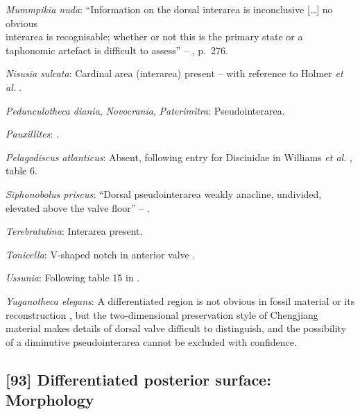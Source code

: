 \documentclass[openany]{book}
\begin{document}
\hypertarget{Mummpikia_nuda-coding-92}{}
\emph{Mummpikia nuda}: ``Information on the dorsal interarea is
inconclusive {[}\ldots{}{]} no obvious\\
interarea is recognisable; whether or not this is the primary state or a
taphonomic artefact is difficult to assess'' --
\citet{Balthasar2008iMummpikia}, p.~276.

\hypertarget{Nisusia_sulcata-coding-92}{}
\emph{Nisusia sulcata}: Cardinal area (interarea) present -- with
reference to Holmer \emph{et al}.
\citeyearpar{Holmer2018Evolutionarysignificance}.

\hypertarget{Novocrania-coding-92}{}
\emph{Pedunculotheca diania}, \emph{Novocrania}, \emph{Paterimitra}:
Pseudointerarea.

\hypertarget{Pauxillites-coding-92}{}
\emph{Pauxillites}: \citet{Marek1966}.

\hypertarget{Pelagodiscus_atlanticus-coding-92}{}
\emph{Pelagodiscus atlanticus}: Absent, following entry for Discinidae
in Williams \emph{et al}.
\citeyearpar{Williams2000LinguliformeaCraniiformea}, table 6.

\hypertarget{Siphonobolus_priscus-coding-92}{}
\emph{Siphonobolus priscus}: ``Dorsal pseudointerarea weakly anacline,
undivided, elevated above the valve floor'' --
\citet{Popov2009Earlyontogeny}.

\hypertarget{Terebratulina-coding-92}{}
\emph{Terebratulina}: Interarea present.

\hypertarget{Tonicella-coding-92}{}
\emph{Tonicella}: V-shaped notch in anterior valve \citep{Schwabe2010}.

\hypertarget{Ussunia-coding-92}{}
\emph{Ussunia}: Following table 15 in
\citet{Williams2000LinguliformeaCraniiformea}.

\hypertarget{Yuganotheca_elegans-coding-92}{}
\emph{Yuganotheca elegans}: A differentiated region is not obvious in
fossil material or its reconstruction \citep{Zhang2014Anearly}, but the
two-dimensional preservation style of Chengjiang material makes details
of dorsal valve difficult to distinguish, and the possibility of a
diminutive pseudointerarea cannot be excluded with confidence.

\subsection*{{[}93{]} Differentiated posterior surface:
Morphology}\label{differentiated-posterior-surface-morphology}
\end{document}
